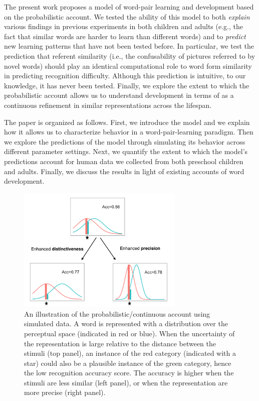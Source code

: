 \documentclass[english,,man]{apa6}
\begin{document}
The present work proposes a model of word-pair learning and development based on the probabilistic account. We tested the ability of this model to both \emph{explain} various findings in previous experiments in both children and adults (e.g., the fact that similar words are harder to learn than different words) and to \emph{predict} new learning patterns that have not been tested before. In particular, we test the prediction that referent similarity (i.e., the confusability of pictures referred to by novel words) should play an identical computational role to word form similarity in predicting recognition difficulty. Although this prediction is intuitive, to our knowledge, it has never been tested. Finally, we explore the extent to which the probabilistic account allows us to understand development in terms of as a continuous refinement in similar representations across the lifespan.

The paper is organized as follows. First, we introduce the model and we explain how it allows us to characterize behavior in a word-pair-learning paradigm. Then we explore the predictions of the model through simulating its behavior across different parameter settings. Next, we quantify the extent to which the model's predictions account for human data we collected from both preschool children and adults. Finally, we discuss the results in light of existing accounts of word development.

\begin{figure}

{\centering \includegraphics[width=300px]{figs/illustration} 

}

\caption{An illustration of the probabilistic/continuous account using simulated data. A word is represented with a distribution over the perceptual space (indicated in red or blue). When the uncertainty of the representation is large relative to the distance between the stimuli (top panel), an instance of the red category (indicated with a star) could also be a plausible instance of the green category, hence the low recognition accuracy score. The accuracy is higher when the stimuli are less similar (left panel), or when the representation are more precise (right panel).}\label{fig:illus}
\end{figure}
\end{document}

